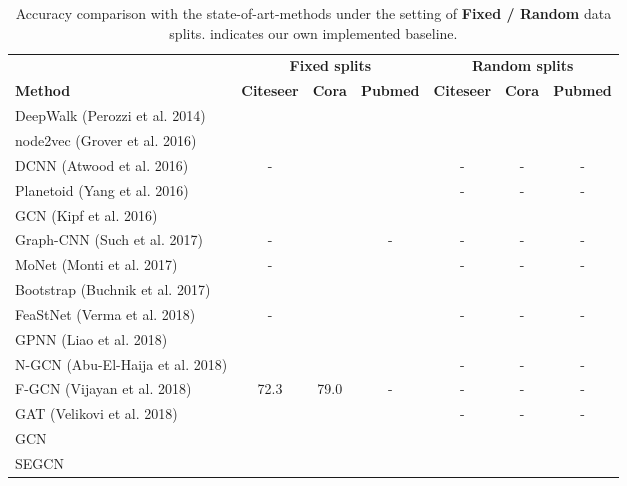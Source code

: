 \documentclass[letterpaper]{article} \usepackage{aaai19}  \usepackage{times}  \usepackage{helvet}  \usepackage{courier}  \usepackage{url}  \usepackage{graphicx}  \usepackage{algorithm}
\begin{document}
\begin{table*}[ht]
\caption{Accuracy comparison with the state-of-art-methods under the setting of \textbf{Fixed / Random} data splits.  indicates our own implemented baseline.}
\label{tab:main}
\vspace{0.1cm}
\centering
\begin{tabular}{l|ccc|ccc}
\hline
& \multicolumn{3}{c}{\textbf{Fixed splits}} & \multicolumn{3}{|c}{\textbf{Random splits}}\\
\textbf{Method}  & \textbf{Citeseer} & \textbf{Cora} & \textbf{Pubmed} & \textbf{Citeseer} & \textbf{Cora} & \textbf{Pubmed}\\ 
\hline






DeepWalk \small{(Perozzi et al. 2014)} &  &  &  &  &  & \\

node2vec \small{(Grover et al. 2016)} &  &  &  &  &  & \\



DCNN \small{(Atwood et al. 2016)} & - &  &   & - & - & - \\

Planetoid \small{(Yang et al. 2016)} &  &  &  & - & - & - \\

GCN \small{(Kipf et al. 2016)} &  &  &  &  &  & \\

Graph-CNN \small{(Such et al. 2017)} & - &  & -  & - & - & - \\

MoNet \small{(Monti et al. 2017)}  & - &  &   & - & - & - \\

Bootstrap \small{(Buchnik et al. 2017)} &  &  &  &  &  & \\


FeaStNet \small{(Verma et al. 2018)} & - &  &  & - & - & - \\

GPNN \small{(Liao et al. 2018)} &  &  &   &  &  &  \\

N-GCN \small{(Abu-El-Haija et al. 2018)} &  &  &  & - & - & - \\

F-GCN \small{(Vijayan et al. 2018)} & 72.3 & 79.0 & - & - & - & - \\

GAT \small{(Velikovi et al. 2018)} &   &   &   & - & - & - \\

\hline

GCN &  &  &  &  &  &  \\

SEGCN &  &  &  &  &  & \\

\hline
\end{tabular}
\end{table*}
 
\end{document}
